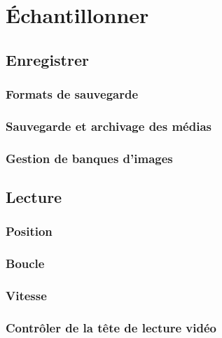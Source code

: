 \documentclass[
]{book}
\begin{document}
\hypertarget{echantillonner}{%
\chapter{Échantillonner}\label{echantillonner}}

\hypertarget{enregistrer}{%
\section{Enregistrer}\label{enregistrer}}

\hypertarget{formats-de-sauvegarde}{%
\subsection{Formats de sauvegarde}\label{formats-de-sauvegarde}}

\hypertarget{sauvegarde-et-archivage-des-muxe9dias}{%
\subsection{Sauvegarde et archivage des médias}\label{sauvegarde-et-archivage-des-muxe9dias}}

\hypertarget{gestion-de-banques-dimages}{%
\subsection{Gestion de banques d'images}\label{gestion-de-banques-dimages}}

\hypertarget{lecture}{%
\section{Lecture}\label{lecture}}

\hypertarget{position}{%
\subsection{Position}\label{position}}

\hypertarget{boucle}{%
\subsection{Boucle}\label{boucle}}

\hypertarget{vitesse}{%
\subsection{Vitesse}\label{vitesse}}

\hypertarget{contruxf4ler-de-la-tuxeate-de-lecture-viduxe9o}{%
\subsection{Contrôler de la tête de lecture vidéo}\label{contruxf4ler-de-la-tuxeate-de-lecture-viduxe9o}}
\end{document}
